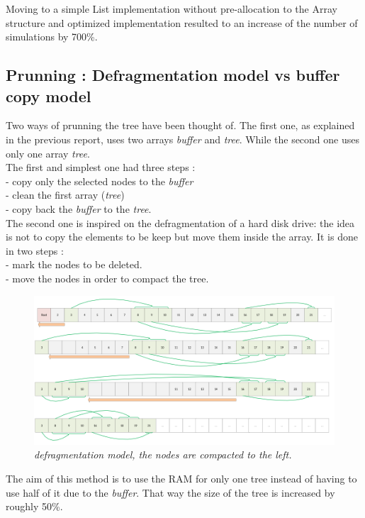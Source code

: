 Moving to a simple List implementation without pre-allocation to the Array structure and optimized implementation resulted to an increase of the number of simulations by 700\%.

\subsection{Prunning : Defragmentation model vs buffer copy model}

Two ways of prunning the tree have been thought of. The first one, as  explained in the previous report, uses two arrays \textit{buffer} and \textit{tree}. While the second one uses only one array \textit{tree}.
\medskip\\
The first and simplest one had three steps : \\
- copy only the selected nodes to the \textit{buffer} \\
- clean the first array (\textit{tree}) \\
- copy back the \textit{buffer} to the \textit{tree}.
\medskip\\
The second one is inspired on the defragmentation of a hard disk drive: the idea is not to copy the elements to be keep but move them inside the array. It is done in two steps : \\
- mark the nodes to be deleted. \\
- move the nodes in order to compact the tree.
\begin{figure}[H] 
\centerline{\includegraphics[width=\textwidth]{Optimisations/array.png}}
\caption{\label{fig:Defrag}\textit{defragmentation model, the nodes are compacted to the left.}}
\end{figure}
The aim of this method is to use the RAM for only one tree instead of having to use half of it due to the \textit{buffer}. That way the size of the tree is increased by roughly 50\%.

